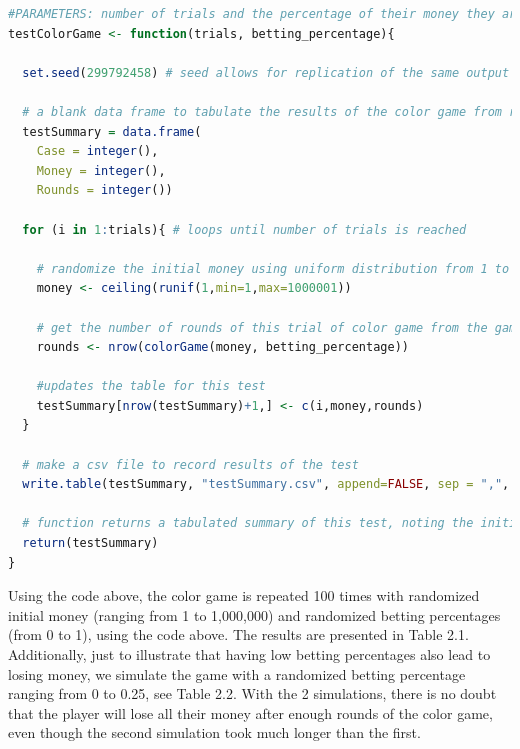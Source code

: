 \documentclass[12pt,letterpaper]{article}
\begin{document}
\begin{enumerate}[label=\Alph*]
\begin{lstlisting}[language=R]
#PARAMETERS: number of trials and the percentage of their money they are willing to bet. betting percentage can be -1, randomize betting percentage for every round
testColorGame <- function(trials, betting_percentage){
  
  set.seed(299792458) # seed allows for replication of the same output
  
  # a blank data frame to tabulate the results of the color game from randomized initial money
  testSummary = data.frame(
    Case = integer(),
    Money = integer(),
    Rounds = integer()) 
  
  for (i in 1:trials){ # loops until number of trials is reached
    
    # randomize the initial money using uniform distribution from 1 to 1,000,000
    money <- ceiling(runif(1,min=1,max=1000001)) 
    
    # get the number of rounds of this trial of color game from the game summary
    rounds <- nrow(colorGame(money, betting_percentage))
    
    #updates the table for this test
    testSummary[nrow(testSummary)+1,] <- c(i,money,rounds) 
  }
  
  # make a csv file to record results of the test
  write.table(testSummary, "testSummary.csv", append=FALSE, sep = ",", row.names = FALSE)
   
  # function returns a tabulated summary of this test, noting the initial money and the number of rounds it took to end the game
  return(testSummary)
}
\end{lstlisting}

Using the code above, the color game is repeated 100 times with randomized initial money (ranging from 1 to 1,000,000) and randomized betting percentages (from 0 to 1), using the code above. The results are presented in Table 2.1. Additionally, just to illustrate that having low betting percentages also lead to losing money, we simulate the game with a randomized betting percentage ranging from 0 to 0.25, see Table 2.2. With the 2 simulations, there is no doubt that the player will lose all their money after enough rounds of the color game, even though the second simulation took much longer than the first.\\


\end{enumerate}
\end{document}
